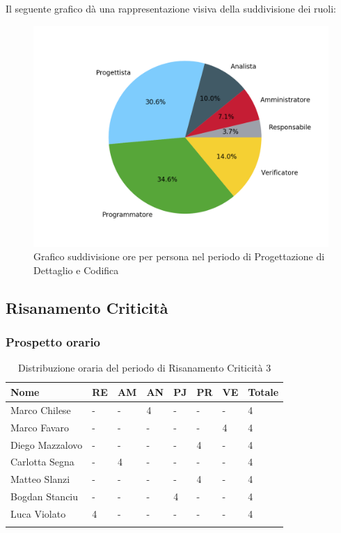 Il seguente grafico dà una rappresentazione visiva della suddivisione dei ruoli:
\begin{figure}[H]
	\centering
	\includegraphics[width=0.8\linewidth]{./images/torta_pdc.png}
	\caption{Grafico suddivisione ore per persona nel periodo di Progettazione di Dettaglio e Codifica}
	\label{fig:grafico suddivione ruoli periodo pdc}
\end{figure}


\subsection{Risanamento Criticità}
\subsubsection{Prospetto orario}
\begin{longtable}{|C{.30\textwidth}|C{.06\textwidth}|C{.06\textwidth}|C{.06\textwidth} | C{.06\textwidth}| C{.06\textwidth} | C{.06\textwidth} | C{.10\textwidth} |}
	\hline
	\textbf{Nome} & \textbf{RE} & \textbf{AM} & \textbf{AN} & \textbf{PJ} & \textbf{PR} & \textbf{VE} & \textbf{Totale}\\
	\hline 
	Marco Chilese & - & - & 4 & - & - & - & 4 \\
	\hline
	Marco Favaro & - & - & - & - & - & 4 & 4 \\
	\hline
	Diego Mazzalovo & - & - & - & - & 4 & - & 4 \\
	\hline
	Carlotta Segna & - & 4 & - & - & - & - & 4 \\
	\hline
	Matteo Slanzi & - & - & - & - & 4 & - & 4 \\
	\hline
	Bogdan Stanciu & - & - & - & 4 & - & - & 4 \\
	\hline
	Luca Violato & 4 & - & - & - & - & - & 4 \\   
	\hline
	
	
	\caption{Distribuzione oraria del periodo di Risanamento Criticità 3}
	\label{Distribuzione oraria rc3}
\end{longtable}

